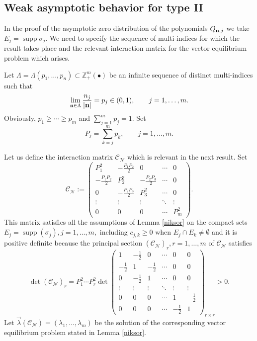 \documentclass{amsart}
\theoremstyle{definition}
\theoremstyle{remark}
\newcommand{\supp}{\operatorname{supp }}
\begin{document}
\subsection{Weak asymptotic behavior for type II}
In the proof of the asymptotic zero distribution of the polynomials $Q_{{\bf n},j}$ we take $E_j = \supp{\sigma_j}$.  We need to specify the sequence of multi-indices for which the result takes place and the relevant interaction matrix for the vector equilibrium problem which arises.

Let $\Lambda =
\Lambda(p_{1},\ldots,p_{n})  \subset
\mathbb{Z}_+^{m}(\bullet)$ be an infinite sequence of distinct multi-indices
such that
\begin{equation} \label{indicesdec}
\lim_{ {\bf n} \in \Lambda} \frac{n_{j}}{|{\bf n}|} = p_{j}
\in (0,1), \qquad j=1,\ldots,m.
\end{equation}
Obviously, $p_{1}\geq \cdots\ge p_{m} $ and $\sum_{j=1}^{m} p_{j}=  1$. Set
\[
P_j=\sum_{k=j}^{m} p_{k},\qquad j=1,\ldots,m.
\]

Let us define the interaction matrix $\mathcal{C}_\mathcal{N}$ which is
relevant in the next result. Set
\begin{equation}\label{matriz}
\mathcal{C}_{\mathcal{N}}:=
\begin{pmatrix}
P_{1}^2 & -\frac{P_{1}P_{2}}{2} & 0 &  \cdots  & 0\\
-\frac{P_{1}P_{2}}{2} & P_{2}^2 &
-\frac{P_{2}P_{3}}{2} & \cdots  & 0\\
0 & -\frac{P_{2}P_{3}}{2} & P_{3}^2
& \cdots  & 0 \\
\vdots &\vdots&\vdots&\ddots &\vdots\\
0 & 0& 0 &\cdots  & P_{m}^2
\end{pmatrix}.
\end{equation}
This matrix satisfies all the assumptions of Lemma \ref{niksor} on
the compact sets $E_j = \supp(\sigma
_j), j=1,\ldots,m,$ including $c_{j,k} \geq
0$ when $E_j \cap E_k \neq \emptyset$  and it is positive definite because the principal
section $(\mathcal{C}_\mathcal{N})_r, r=1,\ldots,m$ of $\mathcal{C}_\mathcal{N}$
satisfies
\begin{displaymath}
\det(\mathcal{C}_\mathcal{N})_r=P_{1}^2\cdots P_{r}^2 \det
\begin{pmatrix}
1 & -\frac{1}{2} & 0 & \cdots & 0 & 0 \\
-\frac{1}{2} & 1 & -\frac{1}{2}  & \cdots & 0 & 0 \\
0 & -\frac{1}{2} &
1  & \cdots & 0 & 0 \\
\vdots & \vdots & \vdots   & \ddots & \vdots & \vdots\\
0 & 0 & 0 & \cdots & 1 & -\frac{1}{2}\\
0 & 0 & 0  & \cdots & -\frac{1}{2} & 1
\end{pmatrix}_{r\times r} > 0.
\end{displaymath}
Let $\vec{\lambda}(\mathcal{C}_\mathcal{N}) = (\lambda_1,\ldots,\lambda_m)$ be the solution of the corresponding vector equilibrium problem stated in Lemma \ref{niksor}.
\end{document}
